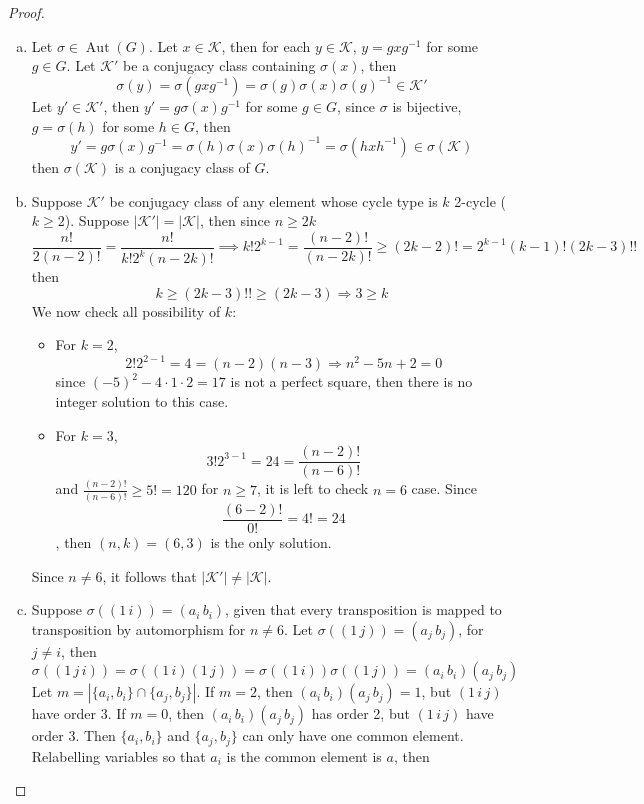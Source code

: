 \documentclass{article}
\DeclareMathOperator{\Aut}{Aut}
\begin{document}
\begin{proof}
\begin{enumerate}[(a)]
    \item 
    Let $\sigma\in \Aut(G)$. Let $x \in \mathcal{K}$, then for each $y \in \mathcal{K}$, $y=gxg^{-1}$ for some $g \in G$. Let $\mathcal{K}'$ be a conjugacy class containing $\sigma(x)$,  then 
    \[
    \sigma(y)=\sigma(gxg^{-1})=\sigma(g)\sigma(x)\sigma(g)^{-1}\in \mathcal{K}'
    \]
    Let $y'\in \mathcal{K}'$, then $y'=g\sigma(x)g^{-1}$ for some $g \in G$, since $\sigma$ is bijective, $g=\sigma(h)$ for some $h \in G$, then
    \[
        y'=g\sigma(x)g^{-1}=\sigma(h)\sigma(x)\sigma(h)^{-1}=\sigma(hxh^{-1})\in \sigma(\mathcal{K})
    \]
    then $\sigma(\mathcal{K})$ is a conjugacy class of $G$.
    \item Suppose $\mathcal{K}'$ be conjugacy class of any element whose cycle type is $k$ 2-cycle ($k\geq 2$). Suppose $|\mathcal{K}'|=|\mathcal{K}|$, then since $n \geq 2k$
    \[
        \frac{n!}{2(n-2)!}=\frac{n!}{k!2^k(n-2k)!}\implies k!2^{k-1}=\frac{(n-2)!}{(n-2k)!} \geq (2k-2)!=2^{k-1}(k-1)!(2k-3)!!
    \]
    then 
    \[
        k\geq (2k-3)!! \geq (2k-3) \Rightarrow 3\geq k
    \]
    We now check all possibility of $k$:
    \begin{itemize}
        \item For $k=2$, 
        \[
            2!2^{2-1}=4=(n-2)(n-3) \Rightarrow n^2-5n+2=0 
        \]
        since $(-5)^2-4\cdot 1 \cdot 2 =17$ is not a perfect square, then there is no integer solution to this case.
        \item For $k=3$, 
        \[
            3!2^{3-1}=24=\frac{(n-2)!}{(n-6)!}
        \]
        and $\frac{(n-2)!}{(n-6)!}\geq 5!=120$ for $n\geq 7$, it is left to check $n=6$ case. Since 
        \[
        \frac{(6-2)!}{0!}=4!=24
        \], then $(n, k)=(6, 3)$ is the only solution. 
    \end{itemize}
    Since $n\neq 6$, it follows that $|\mathcal{K}'|\neq |\mathcal{K}|$.
    \item Suppose $\sigma((1\, i))=(a_i\, b_i)$, given that every transposition is mapped to transposition by automorphism for $n\neq 6$. Let $\sigma((1 \, j))=(a_j\, b_j)$, for $j\neq i$, then 
    \[
        \sigma((1\, j\, i))=\sigma((1\, i)(1\, j))=\sigma((1\, i))\sigma((1\, j))=(a_i\, b_i)(a_j\, b_j)
    \]
    Let $m=|\{a_i, b_i\}\cap\{a_j, b_j\}|$. If $m=2$, then $(a_i\, b_i)(a_j\, b_j)=1$, but $(1\, i\, j)$ have order 3.
    If $m=0$, then $(a_i\, b_i)(a_j\, b_j)$ has order 2, but $(1\, i\, j)$ have order 3. Then $\{a_i, b_i\}$ and $\{a_j, b_j\}$ can only have one common element. Relabelling variables so that $a_i$ is the common element is $a$, then 

\end{enumerate}
\end{proof}
\end{document}
